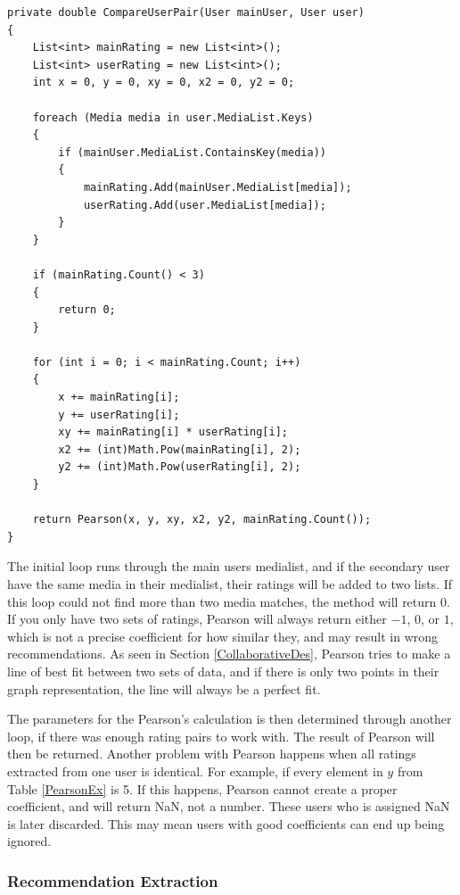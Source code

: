 \begin{lstlisting}[caption={The CompareUserPair method},label={CompareUserPairTwo}]
private double CompareUserPair(User mainUser, User user)
{
	List<int> mainRating = new List<int>();
	List<int> userRating = new List<int>();
	int x = 0, y = 0, xy = 0, x2 = 0, y2 = 0;

	foreach (Media media in user.MediaList.Keys)
	{
		if (mainUser.MediaList.ContainsKey(media))
		{
			mainRating.Add(mainUser.MediaList[media]);
			userRating.Add(user.MediaList[media]);
		}
	}

	if (mainRating.Count() < 3)
	{
		return 0;
	}

	for (int i = 0; i < mainRating.Count; i++)
	{
		x += mainRating[i];
		y += userRating[i];
		xy += mainRating[i] * userRating[i];
		x2 += (int)Math.Pow(mainRating[i], 2);
		y2 += (int)Math.Pow(userRating[i], 2);
	}

	return Pearson(x, y, xy, x2, y2, mainRating.Count());
}
\end{lstlisting}

The initial loop runs through the main users medialist, and if the secondary user have the same media in their medialist, their ratings will be added to two lists. If this loop could not find more than two media matches, the method will return 0. If you only have two sets of ratings, Pearson will always return either $-1$, $0$, or $1$, which is not a precise coefficient for how similar they, and may result in wrong recommendations. As seen in Section \ref{CollaborativeDes}, Pearson tries to make a line of best fit between two sets of data, and if there is only two points in their graph representation, the line will always be a perfect fit. 


The parameters for the Pearson's calculation is then determined through another loop, if there was enough rating pairs to work with. The result of Pearson will then be returned. Another problem with Pearson happens when all ratings extracted from one user is identical. For example, if every element in $y$ from Table \ref{PearsonEx} is 5. If this happens, Pearson cannot create a proper coefficient, and will return NaN, not a number. These users who is assigned NaN is later discarded. This may mean users with good coefficients can end up being ignored.

\subsubsection{Recommendation Extraction}

